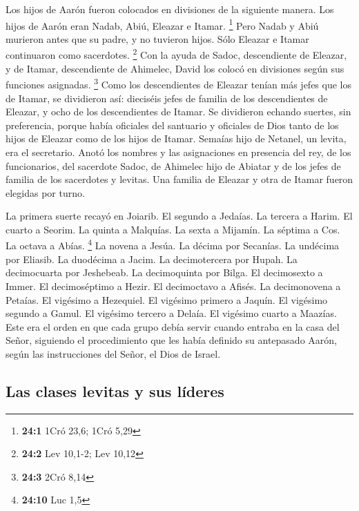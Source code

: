  Los hijos de Aarón fueron colocados en divisiones de la
siguiente manera. Los hijos de Aarón eran Nadab, Abiú, Eleazar e Itamar.
\footnote{\textbf{24:1} 1Cró 23,6; 1Cró 5,29}  Pero Nadab
y Abiú murieron antes que su padre, y no tuvieron hijos. Sólo Eleazar e
Itamar continuaron como sacerdotes. \footnote{\textbf{24:2} Lev 10,1-2;
  Lev 10,12}  Con la ayuda de Sadoc, descendiente de
Eleazar, y de Itamar, descendiente de Ahimelec, David los colocó en
divisiones según sus funciones asignadas. \footnote{\textbf{24:3} 2Cró
  8,14}  Como los descendientes de Eleazar tenían más
jefes que los de Itamar, se dividieron así: dieciséis jefes de familia
de los descendientes de Eleazar, y ocho de los descendientes de Itamar.
 Se dividieron echando suertes, sin preferencia, porque
había oficiales del santuario y oficiales de Dios tanto de los hijos de
Eleazar como de los hijos de Itamar.  Semaías hijo de
Netanel, un levita, era el secretario. Anotó los nombres y las
asignaciones en presencia del rey, de los funcionarios, del sacerdote
Sadoc, de Ahimelec hijo de Abiatar y de los jefes de familia de los
sacerdotes y levitas. Una familia de Eleazar y otra de Itamar fueron
elegidas por turno.

 La primera suerte recayó en Joiarib. El segundo a
Jedaías.  La tercera a Harim. El cuarto a Seorim.
 La quinta a Malquías. La sexta a Mijamín. 
La séptima a Cos. La octava a Abías. \footnote{\textbf{24:10} Luc 1,5}
 La novena a Jesúa. La décima por Secanías.
 La undécima por Eliasib. La duodécima a Jacim.
 La decimotercera por Hupah. La decimocuarta por
Jeshebeab.  La decimoquinta por Bilga. El decimosexto a
Immer.  El decimoséptimo a Hezir. El decimoctavo a
Afisés.  La decimonovena a Petaías. El vigésimo a
Hezequiel.  El vigésimo primero a Jaquín. El vigésimo
segundo a Gamul.  El vigésimo tercero a Delaía. El
vigésimo cuarto a Maazías.  Este era el orden en que cada
grupo debía servir cuando entraba en la casa del Señor, siguiendo el
procedimiento que les había definido su antepasado Aarón, según las
instrucciones del Señor, el Dios de Israel.

\hypertarget{las-clases-levitas-y-sus-luxedderes}{%
\subsection{Las clases levitas y sus
líderes}\label{las-clases-levitas-y-sus-luxedderes}}

